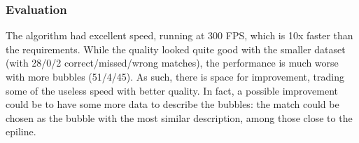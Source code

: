 \subsubsection{Evaluation}

The algorithm had excellent speed, running at 300 FPS, which is 10x faster than the requirements.
While the quality looked quite good with the smaller dataset (with 28/0/2 correct/missed/wrong matches), the performance is much worse with more bubbles (51/4/45).
As such, there is space for improvement, trading some of the useless speed with better quality.
In fact, a possible improvement could be to have some more data to describe the bubbles: the match could be chosen as the bubble with the most similar description, among those close to the epiline.
